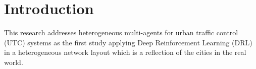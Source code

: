 \documentclass{llncs}
\begin{document}
\begin{abstract}
\end{abstract}

\section{Introduction}


This research addresses heterogeneous multi-agents for  urban traffic control (UTC) systems as the first study applying Deep Reinforcement Learning (DRL) in a heterogeneous network layout which is a reflection of the cities in the real world. 
\end{document}
